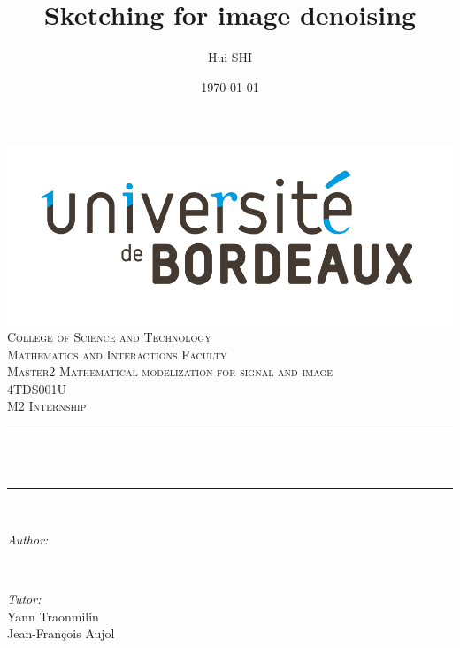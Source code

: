 \documentclass[12pt,a4paper]{article}
\title{Sketching for image denoising}
\author{Hui SHI}
\date{\today}
\makeatletter
\let\thetitle\@title
\let\theauthor\@author
\let\thedate\@date
\makeatother
\begin{document}

\begin{titlepage}
	\centering
    \vspace*{0.5 cm}
    \includegraphics[scale = 0.2]{logo.jpg}\\[0.5 cm]	
    \textsc{\Large College of Science and Technology}\\[0.3 cm]
    \textsc{\Large Mathematics and Interactions Faculty}\\[0.3 cm]
    \textsc{\Large Master2 Mathematical modelization for signal and image}\\[2.0 cm]
	\textsc{\large 4TDS001U}\\[0.5 cm]				
	\textsc{\Large M2 Internship}\\[0.5 cm]				
	\rule{\linewidth}{0.2 mm} \\[0.4 cm]
	{ \huge \bfseries \thetitle}\\
	\rule{\linewidth}{0.2 mm} \\[1.5 cm]
	
	\begin{minipage}{0.4\textwidth}
		\begin{flushleft} \large
			\emph{Author:}\\
			\theauthor
			\end{flushleft}
			\end{minipage}~
			\begin{minipage}{0.4\textwidth}
			\begin{flushright} \large
			\emph{Tutor:} \\
				Yann Traonmilin	\\
				Jean\hyp{}François Aujol
		\end{flushright}
	\end{minipage}\\[3 cm]
	
	{\large \thedate}\\[2 cm]
 
	\vfill
	
\end{titlepage}
\end{document}
